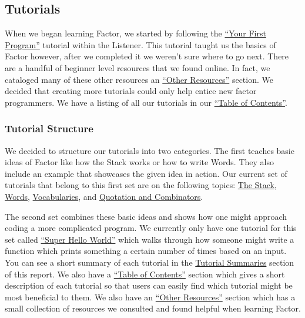 \documentclass[
]{article}
\begin{document}
\hypertarget{tutorials}{%
\subsection{Tutorials}\label{tutorials}}

When we began learning Factor, we started by following the
\href{https://docs.factorcode.org/content/article-first-program.html}{``Your
First Program''} tutorial within the Listener. This tutorial taught us
the basics of Factor however, after we completed it we weren't sure
where to go next. There are a handful of beginner level resources that
we found online. In fact, we cataloged many of these other resources an
\href{https://factor.netlify.app/book/Resources.md}{``Other Resources''}
section. We decided that creating more tutorials could only help entice
new factor programmers. We have a listing of all our tutorials in our
\href{https://factor.netlify.app/book/Table_of_Contents.md}{``Table of
Contents''}.

\hypertarget{tutorial-structure}{%
\subsubsection{Tutorial Structure}\label{tutorial-structure}}

We decided to structure our tutorials into two categories. The first
teaches basic ideas of Factor like how the Stack works or how to write
Words. They also include an example that showcases the given idea in
action. Our current set of tutorials that belong to this first set are
on the following topics:
\href{https://factor.netlify.app/book/the-stack.md}{The Stack},
\href{https://factor.netlify.app/book/words.md}{Words},
\href{https://factor.netlify.app/book/vocabularies.md}{Vocabularies}, and 
\href{https://factor.netlify.app/book/quotations_combinators.md}{Quotation
and Combinators}.

The second set combines these basic ideas and shows how one might
approach coding a more complicated program. We currently only have one
tutorial for this set called
\href{https://factor.netlify.app/book/Super_Hello_World.md}{``Super
Hello World''} which walks through how someone might write a function
which prints something a certain number of times based on an input. You
can see a short summary of each tutorial in the
\href{tutorials.md}{Tutorial Summaries} section of this report. We also
have a
\href{https://factor.netlify.app/book/Table_of_Contents.md}{``Table of
Contents''} section which gives a short description of each tutorial so
that users can easily find which tutorial might be most beneficial to
them. We also have an
\href{https://factor.netlify.app/book/Resources.md}{``Other Resources''}
section which has a small collection of resources we consulted and found
helpful when learning Factor.
\end{document}
